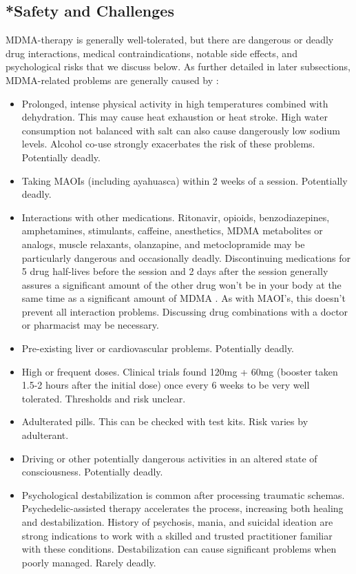 \documentclass[12pt,letterpaper]{article}
\begin{document}
\subsection{*Safety and Challenges}
\label{sec:safety}
MDMA-therapy is generally well-tolerated, but there are dangerous or deadly drug interactions, medical contraindications, notable side effects, and psychological risks that we discuss below. As further detailed in later subsections, MDMA-related problems are generally caused by \cite{riggDeaths,roxburghDeaths}:
\begin{itemize}
    \item Prolonged, intense physical activity in high temperatures combined with dehydration. This may cause heat exhaustion or heat stroke. High water consumption not balanced with salt can also cause dangerously low sodium levels. Alcohol co-use strongly exacerbates the risk of these problems. Potentially deadly.
    \item Taking MAOIs (including ayahuasca) within 2 weeks of a session. Potentially deadly.
    \item Interactions with other medications. Ritonavir, opioids, benzodiazepines, amphetamines, stimulants, caffeine, anesthetics, MDMA metabolites or analogs, muscle relaxants, olanzapine, and metoclopramide may be particularly dangerous and occasionally deadly. Discontinuing medications for 5 drug half-lives before the session and 2 days after the session generally assures a significant amount of the other drug won't be in your body at the same time as a significant amount of MDMA . As with MAOI's, this doesn't prevent all interaction problems. Discussing drug combinations with a doctor or pharmacist may be necessary.
    \item Pre-existing liver or cardiovascular problems. Potentially deadly.
    \item High or frequent doses. Clinical trials found 120mg + 60mg (booster taken 1.5-2 hours after the initial dose) once every 6 weeks to be very well tolerated. Thresholds and risk unclear.
    \item Adulterated pills. This can be checked with test kits. Risk varies by adulterant.
    \item Driving or other potentially dangerous activities in an altered state of consciousness. Potentially deadly.
    \item Psychological destabilization is common after processing traumatic schemas. Psychedelic-assisted therapy accelerates the process, increasing both healing and destabilization. History of psychosis, mania, and suicidal ideation are strong indications to work with a skilled and trusted practitioner familiar with these conditions. Destabilization can cause significant problems when poorly managed. Rarely deadly.
\end{itemize}
\end{document}
